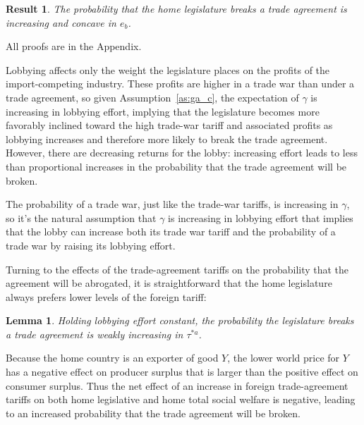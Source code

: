 \documentclass[10pt]{article}
\newtheorem{lemma}{Lemma}
\newtheorem{result}{Result}
\newcommand{\ga}{\gamma}
\begin{document}
\begin{result}
  The probability that the home legislature breaks a trade agreement is increasing and concave in $e_b$.
  \label{res:bincC}
\end{result}

\noindent All proofs are in the Appendix.

Lobbying affects only the weight the legislature places on the profits of the import-competing industry. These profits are higher in a trade war than under a trade agreement, so given Assumption~\ref{as:ga_c}, the expectation of $\ga$ is increasing in lobbying effort, implying that the legislature becomes more favorably inclined toward the high trade-war tariff and associated profits as lobbying increases and therefore more likely to break the trade agreement. However, there are decreasing returns for the lobby: increasing effort leads to less than proportional increases in the probability that the trade agreement will be broken.

The probability of a trade war, just like the trade-war tariffs, is increasing in $\ga$, so it's the natural assumption that $\ga$ is increasing in lobbying effort that implies that the lobby can increase both its trade war tariff and the probability of a trade war by raising its lobbying effort.

Turning to the effects of the trade-agreement tariffs on the probability that the agreement will be abrogated, it is straightforward that the home legislature always prefers lower levels of the foreign tariff:
\begin{lemma}
  Holding lobbying effort constant, the probability the legislature breaks a trade agreement is weakly increasing in $\tau^{*a}$.
  \label{lem:leg_astar}
\end{lemma}

Because the home country is an exporter of good $Y$, the lower world price for $Y$ has a negative effect on producer surplus that is larger than the positive effect on consumer surplus. Thus the net effect of an increase in foreign trade-agreement tariffs on both home legislative and home total social welfare is negative, leading to an increased probability that the trade agreement will be broken.
\end{document}
